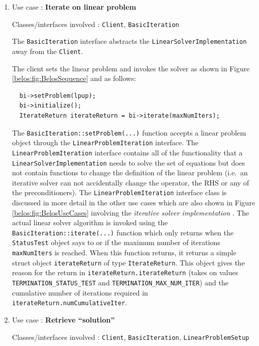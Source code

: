 \documentclass[pdf,ps2pdf,11pt]{SANDreport}
\begin{document}
\begin{enumerate}
{}\item Use case : \textbf{Iterate on linear problem}

{}\noindent{}Classes/interfaces involved : {}\texttt{Client},
{}\texttt{Basic\-Iteration}

The {}\texttt{Basic\-Iteration} interface abstracts the
{}\texttt{Linear\-Solver\-Implementation} away from the
{}\texttt{Client}.

The client sets the linear problem and invokes the solver as shown
in Figure {}\ref{belos:fig:BelosSequence} and as follows:

{\scriptsize\begin{verbatim}
  bi->setProblem(lpup);
  bi->initialize();
  IterateReturn iterateReturn = bi->iterate(maxNumIters);
\end{verbatim}}

The {}\texttt{Basic\-Iteration::\-set\-Problem(...)} function accepts
a linear problem object through the
{}\texttt{Linear\-Problem\-Iteration} interface.  The
{}\texttt{Linear\-Problem\-Iteration} interface contains all of the
functionality that a {}\texttt{Linear\-Solver\-Implementation} needs
to solve the set of equations but does not contain functions to change
the definition of the linear problem (i.e.~an iterative solver can not
accidentally change the operator, the RHS or any of the
preconditioners).  The {}\texttt{Linear\-Problem\-Iteration} interface
class is discussed in more detail in the other use cases which are
also shown in Figure {}\ref{belos:fig:BelosUseCases} involving the
{}\textit{iterative solver implementation} .  The actual linear solver
algorithm is invoked using the
{}\texttt{Basic\-Iteration::\-iterate(...)} function which only
returns when the {}\texttt{Status\-Test} object says to or if the
maximum number of iterations {}\texttt{maxNumIters} is reached.  When
this function returns, it returns a simple struct object
{}\texttt{iterateReturn} of type {}\texttt{IterateReturn}.  This
object gives the reason for the return in
{}\texttt{iterateReturn\-.iterateReturn} (takes on values
{}\texttt{TERMINATION\-\_STATUS\-\_TEST} and
{}\texttt{TERMINATION\-\_MAX\-\_NUM\-\_ITER}) and the cumulative
number of iterations required in
{}\texttt{iterateReturn\-.numCumulativeIter}.

{}\item Use case : \textbf{Retrieve ``solution''}

{}\noindent{}Classes/interfaces involved : {}\texttt{Client},
{}\texttt{Basic\-Iteration}, {}\texttt{Linear\-Problem\-Setup}


\end{enumerate}
\end{document}

